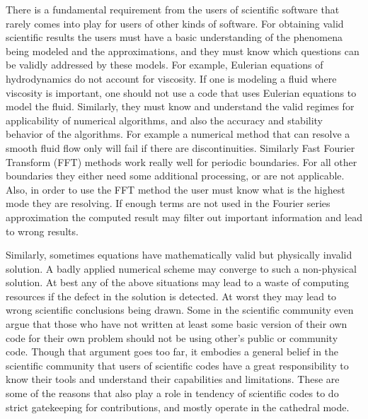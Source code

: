 \label{sec:using}
There is a fundamental requirement from the users of scientific
software that rarely comes into play for users of other kinds of
software. For obtaining valid scientific results the users must 
have a basic understanding of the phenomena being modeled and the
approximations, and they must know which questions can be validly 
addressed by these models. For example, Eulerian equations of
hydrodynamics do not account for viscosity. If one is modeling a fluid
where viscosity is important, one should not use a code that uses
Eulerian equations to model the fluid. Similarly, they must know and
understand the valid regimes for applicability of numerical
algorithms, and also the accuracy and stability behavior of the
algorithms. For example a numerical method that can resolve a smooth
fluid flow only will fail if there are discontinuities. Similarly Fast
Fourier Transform (FFT) methods work really well for periodic
boundaries. For all other boundaries they either need some additional
processing, or are not applicable. Also, in order to use the FFT
method the user must know what is the highest mode they are
resolving. If enough terms are not used in the Fourier series
approximation the computed result may filter out important information
and lead to wrong results.

Similarly, sometimes equations have mathematically valid but
physically invalid solution. A badly applied numerical scheme may
converge to such a non-physical solution. At best any of the above
situations may lead to a waste of computing resources if the defect in
the solution is detected. At worst they may lead to wrong scientific
conclusions being drawn. Some in the scientific community even argue
that those who have not written at least some basic version of their
own code for their own problem should not be using other's public or
community code. Though that argument goes too far, it embodies a
general belief in the scientific community that users of scientific
codes have a great responsibility to know their tools and understand
their capabilities and limitations. 
These are some of the reasons that also play a role in tendency of scientific
codes to do strict gatekeeping for contributions,  and mostly operate
in the cathedral mode.  

